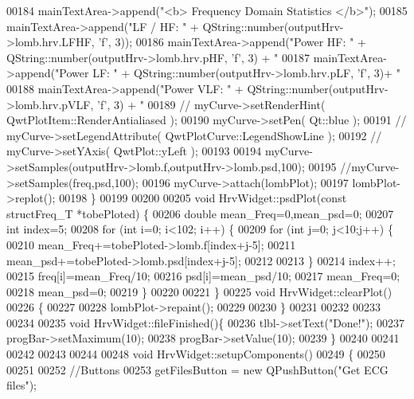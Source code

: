 \begin{DoxyCode}
00184   mainTextArea->append(\textcolor{stringliteral}{"<b> Frequency Domain Statistics </b>"});
00185     mainTextArea->append(\textcolor{stringliteral}{"LF / HF: "} + QString::number(outputHrv->lomb.hrv.LFHF, \textcolor{charliteral}{'f'}, 3));
00186             mainTextArea->append(\textcolor{stringliteral}{"Power HF: "} + QString::number(outputHrv->lomb.hrv.pHF, \textcolor{charliteral}{'f'}, 3) + \textcolor{stringliteral}{"%
00187             mainTextArea->append(\textcolor{stringliteral}{"Power LF: "} + QString::number(outputHrv->lomb.hrv.pLF, \textcolor{charliteral}{'f'}, 3)+ \textcolor{stringliteral}{"%
00188         mainTextArea->append(\textcolor{stringliteral}{"Power VLF: "} + QString::number(outputHrv->lomb.hrv.pVLF, \textcolor{charliteral}{'f'}, 3) + \textcolor{stringliteral}{"%
00189     \textcolor{comment}{//   myCurve->setRenderHint( QwtPlotItem::RenderAntialiased );}
00190        myCurve->setPen( Qt::blue );
00191      \textcolor{comment}{//  myCurve->setLegendAttribute( QwtPlotCurve::LegendShowLine );}
00192      \textcolor{comment}{//  myCurve->setYAxis( QwtPlot::yLeft );}
00193 
00194        myCurve->setSamples(outputHrv->lomb.f,outputHrv->lomb.psd,100);
00195        \textcolor{comment}{//myCurve->setSamples(freq,psd,100);}
00196        myCurve->attach(lombPlot);
00197        lombPlot->replot();
00198 \}
00199 
00200 
00205 \textcolor{keywordtype}{void} HrvWidget::psdPlot(\textcolor{keyword}{const} structFreq\_T *tobePloted) \{
00206     \textcolor{keywordtype}{double} mean\_Freq=0,mean\_psd=0;
00207     \textcolor{keywordtype}{int} index=5;
00208     \textcolor{keywordflow}{for} (\textcolor{keywordtype}{int} i=0; i<102; i++) \{
00209     \textcolor{keywordflow}{for} (\textcolor{keywordtype}{int} j=0; j<10;j++) \{
00210         mean\_Freq+=tobePloted->lomb.f[index+j-5];
00211         mean\_psd+=tobePloted->lomb.psd[index+j-5];
00212 
00213     \}
00214     index++;
00215     freq[i]=mean\_Freq/10;
00216     psd[i]=mean\_psd/10;
00217     mean\_Freq=0;
00218     mean\_psd=0;
00219     \}
00220 
00221 \}
00225 \textcolor{keywordtype}{void} HrvWidget::clearPlot()
00226 \{
00227 
00228         lombPlot->repaint();
00229 
00230 \}
00231 
00232 
00233 
00234 
00235 \textcolor{keywordtype}{void} HrvWidget::fileFinished()\{
00236     tlbl->setText(\textcolor{stringliteral}{"Done!"});
00237     progBar->setMaximum(10);
00238     progBar->setValue(10);
00239 \}
00240 
00241 
00242 
00243 
00244 
00248 \textcolor{keywordtype}{void} HrvWidget::setupComponents()
00249 \{
00250 
00251 
00252     \textcolor{comment}{//Buttons}
00253     getFilesButton = \textcolor{keyword}{new} QPushButton(\textcolor{stringliteral}{"Get ECG files"});
}}}
\end{DoxyCode}
